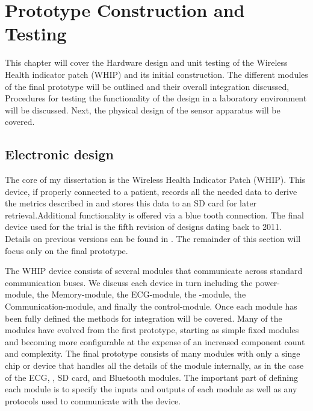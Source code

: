 \chapter{Prototype Construction and Testing}
\label{chap:ProtoTypeBuildTest}


This chapter will cover the Hardware design and unit testing of the Wireless Health indicator patch (WHIP) and its initial construction. The different modules of the final prototype will be outlined and their overall integration discussed, Procedures for testing the functionality of the design in a laboratory environment will be discussed. Next, the physical design of the sensor apparatus will be covered.

\section{Electronic design}


The core of my dissertation is the Wireless Health Indicator Patch (WHIP). This device, if properly connected to a patient, records all the needed data to derive the metrics described in \label{Sensor Concepts} and stores this data to an SD card for later retrieval.Additional  functionality is offered via a blue tooth connection. The final device used for the trial is the fifth revision of designs dating back to 2011. Details on previous versions can be found in . The remainder of this section will focus only on the final prototype.

The WHIP device consists of several modules that communicate across standard communication buses. We discuss each device in turn including the power-module, the Memory-module, the ECG-module, the -module, the Communication-module, and finally the control-module. Once each module has been fully defined the methods for integration will be covered. Many of the modules have evolved from the first prototype, starting as simple fixed modules and becoming more configurable at the expense of an increased component count and complexity. The final prototype consists of many modules with only a singe chip or device that handles all the details of the module internally, as in the case of the ECG, , SD card, and Bluetooth modules. The important part of defining each module is to specify the inputs and outputs of each module as well as any protocols used to communicate with the device.

